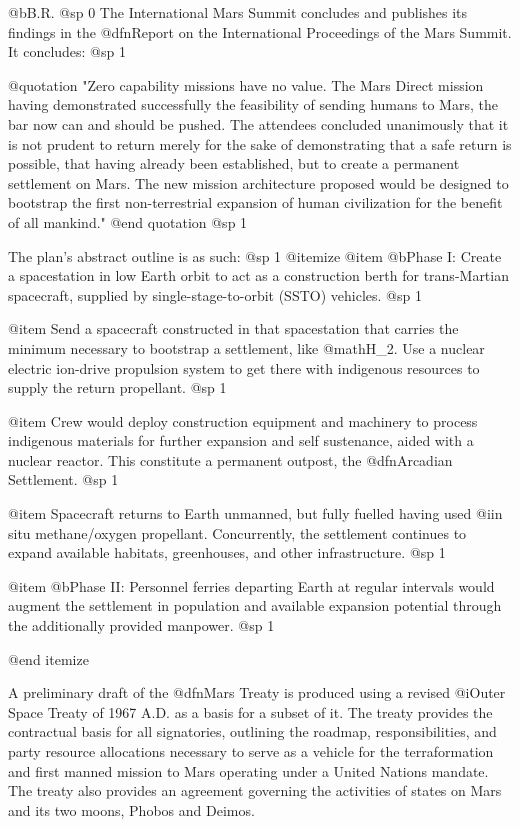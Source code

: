 @b{B.R.}
@sp 0
The International Mars Summit concludes and publishes its findings in the @dfn{Report on the International Proceedings of the Mars Summit}. It concludes:
@sp 1

@quotation
"Zero capability missions have no value. The Mars Direct mission having demonstrated successfully the feasibility of sending humans to Mars, the bar now can and should be pushed. The attendees concluded unanimously that it is not prudent to return merely for the sake of demonstrating that a safe return is possible, that having already been established, but to create a permanent settlement on Mars. The new mission architecture proposed would be designed to bootstrap the first non-terrestrial expansion of human civilization for the benefit of all mankind."
@end quotation
@sp 1

The plan's abstract outline is as such:
@sp 1
@itemize
@item
@b{Phase I:} Create a spacestation in low Earth orbit to act as a construction berth for trans-Martian spacecraft, supplied by single-stage-to-orbit (SSTO) vehicles.
@sp 1

@item
Send a spacecraft constructed in that spacestation that carries the minimum necessary to bootstrap a settlement, like @math{H_2}. Use a nuclear electric ion-drive propulsion system to get there with indigenous resources to supply the return propellant.
@sp 1

@item
Crew would deploy construction equipment and machinery to process indigenous materials for further expansion and self sustenance, aided with a nuclear reactor. This constitute a permanent outpost, the @dfn{Arcadian Settlement}.
@sp 1

@item
Spacecraft returns to Earth unmanned, but fully fuelled having used @i{in situ} methane/oxygen propellant. Concurrently, the settlement continues to expand available habitats, greenhouses, and other infrastructure.
@sp 1

@item
@b{Phase II:} Personnel ferries departing Earth at regular intervals would augment the settlement in population and available expansion potential through the additionally provided manpower.
@sp 1

@end itemize

A preliminary draft of the @dfn{Mars Treaty} is produced using a revised @i{Outer Space Treaty} of 1967 A.D. as a basis for a subset of it. The treaty provides the contractual basis for all signatories, outlining the roadmap, responsibilities, and party resource allocations necessary to serve as a vehicle for the terraformation and first manned mission to Mars operating under a United Nations mandate. The treaty also provides an agreement governing the activities of states on Mars and its two moons, Phobos and Deimos.

